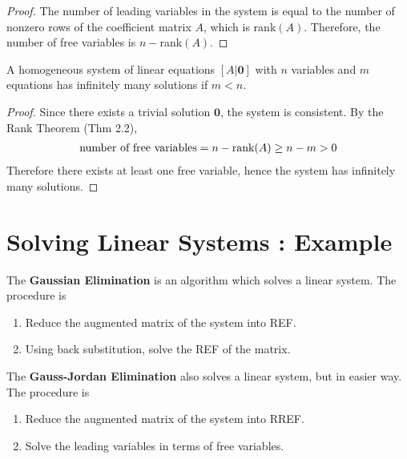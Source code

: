 \begin{proof}
	The number of leading variables in the system is equal to the number of nonzero rows of the coefficient matrix $A$, which is rank$(A)$. Therefore, the number of free variables is $n-$rank$(A)$.
\end{proof}

\begin{theorem}
	A homogeneous system of linear equations $[A|\textbf{0}]$ with $n$ variables and $m$ equations has infinitely many solutions if $m<n$.
\end{theorem}

\begin{proof}
	Since there exists a trivial solution $\textbf{0}$, the system is consistent. By the Rank Theorem (Thm 2.2),
	\begin{align*}
		\textnormal{number of free variables} = n - \textnormal{rank}(A) \ge n - m > 0
	\end{align*} Therefore there exists at least one free variable, hence the system has infinitely many solutions.
\end{proof}

\section{Solving Linear Systems : Example}

\noindent The \textbf{Gaussian Elimination} is an algorithm which solves a linear system. The procedure is
\begin{enumerate}
	\item Reduce the augmented matrix of the system into REF.
	\item Using back substitution, solve the REF of the matrix.
\end{enumerate}

\noindent The \textbf{Gauss-Jordan Elimination} also solves a linear system, but in easier way. The procedure is
\begin{enumerate}
	\item Reduce the augmented matrix of the system into RREF.
	\item Solve the leading variables in terms of free variables.
\end{enumerate}

